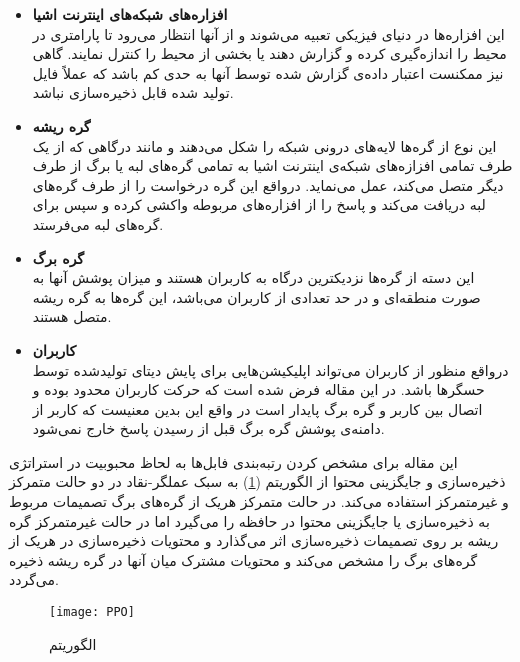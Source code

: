 \begin{itemize}
	\item \textbf{افزاره‌های شبکه‌های اینترنت اشیا}\\
	این افزاره‌ها در دنیای فیزیکی تعبیه می‌شوند و از آنها انتظار می‌رود تا پارامتری در محیط را اندازه‌گیری کرده و گزارش دهند یا بخشی از محیط را کنترل نمایند. گاهی نیز ممکنست اعتبار داده‌ی گزارش شده توسط آنها به حدی کم باشد که عملاً فایل تولید شده قابل ذخیره‌سازی نباشد.
	\item \textbf{گره ریشه}\\
	این نوع از گره‌ها لایه‌های درونی شبکه را شکل می‌دهند و مانند درگاهی که از یک طرف تمامی افزازه‌های شبکه‌ی اینترنت اشیا به تمامی گره‌های لبه یا برگ از طرف دیگر متصل می‌کند، عمل می‌نماید. درواقع این گره درخواست را از طرف گره‌های لبه دریافت می‌کند و پاسخ را از افزاره‌های مربوطه واکشی کرده و سپس برای گره‌های لبه می‌فرستد.
	\item \textbf{گره برگ}\\
	این دسته از گره‌ها نزدیکترین درگاه به کاربران هستند و میزان پوشش آنها به صورت منطقه‌ای و در حد تعدادی از کاربران می‌باشد، این گره‌ها به گره ریشه متصل هستند. 
	\item \textbf{کاربران}\\
	درواقع منظور از کاربران می‌تواند اپلیکیشن‌هایی برای پایش دیتای تولیدشده توسط حسگرها باشد. در این مقاله فرض شده است که حرکت کاربران محدود بوده و اتصال بین کاربر و گره برگ پایدار است در واقع این بدین معنیست که کاربر از دامنه‌ی پوشش گره برگ قبل از رسیدن پاسخ خارج نمی‌شود. 
\end{itemize}

این مقاله برای مشخص کردن رتبه‌بندی فابل‌ها به لحاظ محبوبیت در استراتژی ذخیره‌سازی و جایگزینی محتوا از الگوریتم  (\ref{fig:ppo}) به سبک عملگر-نقاد در دو حالت متمرکز و غیرمتمرکز استفاده می‌کند. در حالت متمرکز هریک از گره‌های برگ تصمیمات مربوط به ذخیره‌سازی یا جایگزینی محتوا در حافظه را می‌گیرد اما در حالت غیرمتمرکز گره ریشه بر روی تصمیمات ذخیره‌سازی اثر می‌گذارد و محتویات 
ذخیره‌سازی در هریک از گره‌های برگ را مشخص می‌کند و محتویات مشترک میان آنها در گره ریشه ذخیره می‌گردد.

\begin{figure}[ht]
	\centerline{\texttt{[image: PPO]}}
	\caption{الگوریتم }
	\label{fig:ppo}
\end{figure}

